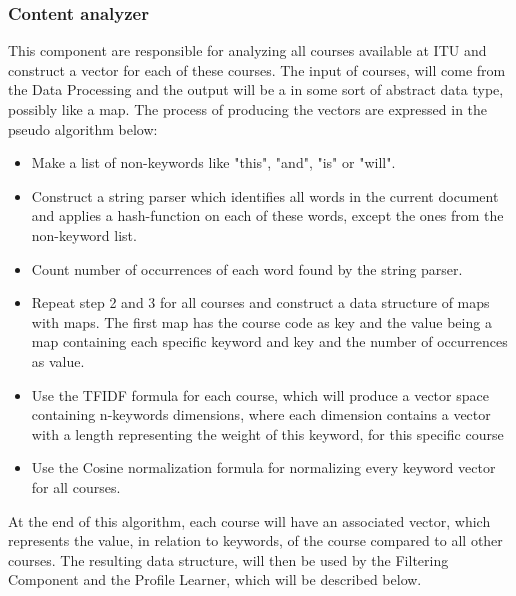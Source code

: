 \subsubsection{Content analyzer}
This component are responsible for analyzing all courses available at ITU and construct a vector for each of these courses. The input of courses, will come from the Data Processing  and the output will be a in some sort of abstract data type, possibly like a map. The process of producing the vectors are expressed in the pseudo algorithm below:
\begin{itemize}
	\item Make a list of non-keywords like "this", "and", "is" or "will".
	\item Construct a string parser which identifies all words in the current document and applies a hash-function on each of these words, except the ones from the non-keyword list.
	\item Count number of occurrences of each word found by the string parser.
	\item Repeat step 2 and 3 for all courses and construct a data structure of maps with maps. The first map has the course code as key and the value being a map containing each specific keyword and key and the number of occurrences as value. 
	\item Use the TFIDF  formula for each course, which will produce a vector space containing n-keywords dimensions, where each dimension contains a vector with a length representing the weight of this keyword, for this specific course 
	\item Use the Cosine normalization formula for normalizing every keyword vector for all courses.
\end{itemize}
At the end of this algorithm, each course will have an associated vector, which represents the value, in relation to keywords, of the course compared to all other courses. The resulting data structure, will then be used by the Filtering Component and the Profile Learner, which will be described below.

